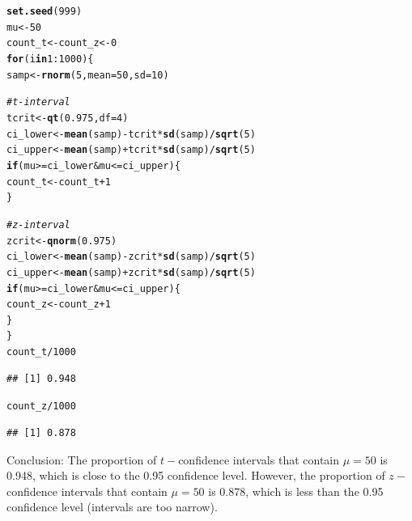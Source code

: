 \documentclass[fleqn, 12pt]{article}\usepackage[]{graphicx}\usepackage[]{color}
\makeatletter
\newcommand{\hlnum}[1]{\textcolor[rgb]{0.686,0.059,0.569}{#1}}%
\newcommand{\hlcom}[1]{\textcolor[rgb]{0.678,0.584,0.686}{\textit{#1}}}%
\newcommand{\hlopt}[1]{\textcolor[rgb]{0,0,0}{#1}}%
\newcommand{\hlstd}[1]{\textcolor[rgb]{0.345,0.345,0.345}{#1}}%
\newcommand{\hlkwa}[1]{\textcolor[rgb]{0.161,0.373,0.58}{\textbf{#1}}}%
\newcommand{\hlkwb}[1]{\textcolor[rgb]{0.69,0.353,0.396}{#1}}%
\newcommand{\hlkwc}[1]{\textcolor[rgb]{0.333,0.667,0.333}{#1}}%
\newcommand{\hlkwd}[1]{\textcolor[rgb]{0.737,0.353,0.396}{\textbf{#1}}}%
\newenvironment{kframe}{%
 \def\at@end@of@kframe{}%
 \ifinner\ifhmode%
  \def\at@end@of@kframe{\end{minipage}}%
  \begin{minipage}{\columnwidth}%
 \fi\fi%
 \def\FrameCommand##1{\hskip\@totalleftmargin \hskip-\fboxsep
 \colorbox{shadecolor}{##1}\hskip-\fboxsep
     \hskip-\linewidth \hskip-\@totalleftmargin \hskip\columnwidth}%
 \MakeFramed {\advance\hsize-\width
   \@totalleftmargin\z@ \linewidth\hsize
   \@setminipage}}%
 {\par\unskip\endMakeFramed%
 \at@end@of@kframe}
\newenvironment{knitrout}{}{} %
\makeatother
\begin{document}
\begin{knitrout}
\color{fgcolor}\begin{kframe}
\begin{alltt}
\hlkwd{set.seed}\hlstd{(}\hlnum{999}\hlstd{)}
\hlstd{mu} \hlkwb{<-} \hlnum{50}
\hlstd{count_t} \hlkwb{<-} \hlstd{count_z} \hlkwb{<-} \hlnum{0}
\hlkwa{for}\hlstd{(i} \hlkwa{in} \hlnum{1}\hlopt{:}\hlnum{1000}\hlstd{) \{}
  \hlstd{samp} \hlkwb{<-} \hlkwd{rnorm}\hlstd{(}\hlnum{5}\hlstd{,} \hlkwc{mean}\hlstd{=}\hlnum{50}\hlstd{,} \hlkwc{sd}\hlstd{=}\hlnum{10}\hlstd{)}

  \hlcom{# t-interval}
  \hlstd{tcrit} \hlkwb{<-} \hlkwd{qt}\hlstd{(}\hlnum{0.975}\hlstd{,} \hlkwc{df}\hlstd{=}\hlnum{4}\hlstd{)}
  \hlstd{ci_lower} \hlkwb{<-} \hlkwd{mean}\hlstd{(samp)} \hlopt{-} \hlstd{tcrit} \hlopt{*} \hlkwd{sd}\hlstd{(samp)} \hlopt{/} \hlkwd{sqrt}\hlstd{(}\hlnum{5}\hlstd{)}
  \hlstd{ci_upper} \hlkwb{<-} \hlkwd{mean}\hlstd{(samp)} \hlopt{+} \hlstd{tcrit} \hlopt{*} \hlkwd{sd}\hlstd{(samp)} \hlopt{/} \hlkwd{sqrt}\hlstd{(}\hlnum{5}\hlstd{)}
  \hlkwa{if}\hlstd{(mu} \hlopt{>=} \hlstd{ci_lower} \hlopt{&} \hlstd{mu} \hlopt{<=} \hlstd{ci_upper) \{}
    \hlstd{count_t} \hlkwb{<-} \hlstd{count_t} \hlopt{+} \hlnum{1}
  \hlstd{\}}

  \hlcom{# z-interval}
  \hlstd{zcrit} \hlkwb{<-} \hlkwd{qnorm}\hlstd{(}\hlnum{0.975}\hlstd{)}
  \hlstd{ci_lower} \hlkwb{<-} \hlkwd{mean}\hlstd{(samp)} \hlopt{-} \hlstd{zcrit} \hlopt{*} \hlkwd{sd}\hlstd{(samp)} \hlopt{/} \hlkwd{sqrt}\hlstd{(}\hlnum{5}\hlstd{)}
  \hlstd{ci_upper} \hlkwb{<-} \hlkwd{mean}\hlstd{(samp)} \hlopt{+} \hlstd{zcrit} \hlopt{*} \hlkwd{sd}\hlstd{(samp)} \hlopt{/} \hlkwd{sqrt}\hlstd{(}\hlnum{5}\hlstd{)}
  \hlkwa{if}\hlstd{(mu} \hlopt{>=} \hlstd{ci_lower} \hlopt{&} \hlstd{mu} \hlopt{<=} \hlstd{ci_upper) \{}
    \hlstd{count_z} \hlkwb{<-} \hlstd{count_z} \hlopt{+} \hlnum{1}
  \hlstd{\}}
\hlstd{\}}
\hlstd{count_t} \hlopt{/} \hlnum{1000}
\end{alltt}
\begin{verbatim}
## [1] 0.948
\end{verbatim}
\begin{alltt}
\hlstd{count_z} \hlopt{/} \hlnum{1000}
\end{alltt}
\begin{verbatim}
## [1] 0.878
\end{verbatim}
\end{kframe}
\end{knitrout}

Conclusion: The proportion of $t-$confidence intervals that contain $\mu=50$ is 0.948, which is close to the 0.95 confidence level.  However, the proportion of $z-$confidence intervals that contain $\mu=50$ is 0.878, which is less than the 0.95 confidence level (intervals are too narrow).
\clearpage
\end{document}
